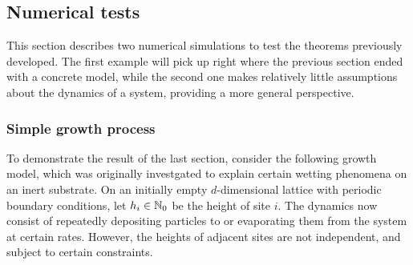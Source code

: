 \subsection{Numerical tests}

This section describes two numerical simulations to test the theorems previously developed. The first example will pick up right where the previous section ended with a concrete model, while the second one makes relatively little assumptions about the dynamics of a system, providing a more general perspective.


\subsubsection{Simple growth process}

To demonstrate the result of the last section, consider the following growth model, which was originally investgated to explain certain wetting phenomena on an inert substrate. On an initially empty \(d\)-dimensional lattice with periodic boundary conditions, let \(h_i \in\mathbb{N}_0\) be the height of site \(i\). The dynamics now consist of repeatedly depositing particles to or evaporating them from the system at certain rates. However, the heights of adjacent sites are not independent, and subject to certain constraints.

